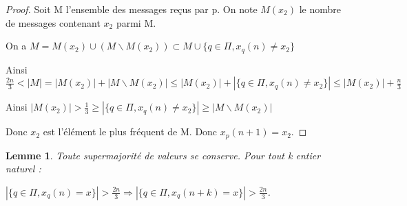 \documentclass{article}
\newtheorem{lemma}{Lemme}
\begin{document}
\begin{proof}

Soit M l'ensemble des messages reçus par p. On note $M(x_2)$ le nombre de messages contenant $x_2$ parmi M.

On a $M = M(x_2) \cup (M \backslash M(x_2) ) \subset M \cup \{ q \in \Pi , x_q(n) \neq x_2 \} $

\vspace{0.4cm}

Ainsi $\frac{2n}{3} < | M | = | M(x_2) | + | M \backslash M(x_2) | \leq | M(x_2) | + | \{ q \in \Pi , x_q(n) \neq x_2 \} | \leq | M(x_2) | +  \frac{n}{3}$

\vspace{0.4cm}

Ainsi  $| M(x_2) | > \frac{1}{3} \geq | \{ q \in \Pi , x_q(n) \neq x_2 \} | \geq | M \backslash M(x_2) |$

Donc $x_2$ est l'élément le plus fréquent de M. Donc $x_p(n+1) = x_2$.

\end{proof}

\begin{lemma}

Toute supermajorité de valeurs se conserve. Pour tout k entier naturel : 

$| \{ q \in \Pi , x_q(n) = x \} | > \frac{2n}{3} \Rightarrow | \{ q \in \Pi , x_q(n+k) = x \} | > \frac{2n}{3}$.

\end{lemma}
\end{document}
